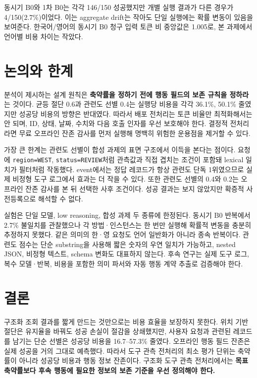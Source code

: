 \documentclass[10pt,twocolumn]{article}
\begin{document}
동시기 B0와 1차 B0는 각각 146/150 성공했지만 개별 실행 결과가 다른 경우가
4/150(2.7\%)이었다. 이는 aggregate drift는 작아도 단일 실행에는 확률 변동이
있음을 보여준다. 한국어/영어의 동시기 B0 청구 입력 토큰 비 중앙값은
1.005로, 본 과제에서 언어별 비용 차이는 작았다.

\section{논의와 한계}
분석이 제시하는 설계 원칙은 \textbf{축약률을 정하기 전에 행동 필드의 보존
규칙을 정하라}는 것이다. 균등 절단 0.6과 관련도 선별 0.4는 실행당 비용을 각각 36.1\%, 50.1\%
줄였지만 성공당 비용의 방향은 반대였다. 따라서 배포 전처리는 토큰 비율만
최적화해서는 안 되며, ID, 상태, 날짜, 수치와 다음 호출 인자를 우선 보호해야
한다. 결정적 전처리라면 무료 오프라인 잔존 감사를 먼저 실행해 명백히 위험한
운용점을 제거할 수 있다.

가장 큰 한계는 관련도 선별이 합성 과제의 표면 구조에서 이득을 본다는 점이다.
요청에 \texttt{region=WEST}, \texttt{status=REVIEW}처럼 관측값과 직접 겹치는
조건이 포함돼 lexical 일치가 필터처럼 작동했다. event에서는 정답 레코드가
항상 관련도 단독 1위였으므로 실제 비정형 도구 로그에서 효과는 더 작을 수
있다. 또한 관련도 선별의 0.4와 0.2는 오프라인 잔존 감사를 본 뒤 선택한
사후 조건이다. 성공 결과는 보지 않았지만 확증적 사전등록으로 해석할 수 없다.

실험은 단일 모델, low reasoning, 합성 과제 두 종류에 한정된다. 동시기 B0
반복에서 2.7\% 불일치를 관찰했으나 각 방법·인스턴스는 한 번만 실행해 확률적
변동을 충분히 추정하지 못했다. 같은 의미의 한·영 요청도 언어 일반화가 아니라
종속 반복이다. 관련도 점수는 단순 substring을 사용해 짧은 숫자의 우연 일치가
가능하고, nested JSON, 비정형 텍스트, schema 변화도 대표하지 않는다. 후속
연구는 실제 도구 로그, 복수 모델·반복, 비용을 포함한 의미 파서와 자동 행동
계약 추출로 검증해야 한다.

\section{결론}
구조화 조회 결과를 짧게 만드는 것만으로는 비용 효율을 보장하지 못한다.
위치 기반 절단은 유지율을 바꿔도 성공 손실이 절감을 상쇄했지만, 사용자 요청과
관련된 레코드를 남기는 단순 선별은 성공당 비용을 16.7--57.3\% 줄였다.
오프라인 행동 필드 잔존은 실제 성공을 거의 그대로 예측했다. 따라서 도구 관측
전처리의 최소 평가 단위는 축약률이 아니라 성공당 비용과 행동 정보 잔존이다.
구조화 도구 관측 전처리에서는 \textbf{목표 축약률보다 후속 행동에 필요한
정보의 보존 기준을 우선 정의해야 한다.}



\end{document}
